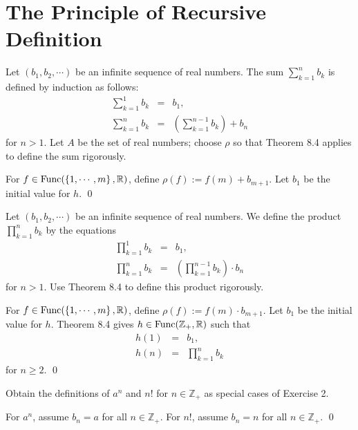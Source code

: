 \documentclass[a4paper,12pt]{article}
\begin{document}
\section{The Principle of Recursive Definition}
\setcounter{exe}{0}
\begin{exe}
	Let \( (b_1,b_2,\cdots) \) be an infinite sequence of real numbers.
	The sum \( \sum_{k=1}^n b_k\) is defined by induction as follows:
	\begin{eqnarray*}
		\sum_{k=1}^1 b_k &=& b_1,\\
		\sum_{k=1}^n b_k &=& \left( \sum_{k=1}^{n-1} b_k \right) + b_n
	\end{eqnarray*}
	for \( n >1 \).
	Let \( A \) be the set of real numbers; choose \( \rho \) so that Theorem 8.4 applies to define the sum rigorously.
\end{exe}
\begin{sol}
	For
	\( f \in \mathrm{Func}(\left\{1, \cdots, m \right\},\mathbb{R}) \),
	define
	\( \rho(f):=f(m) + b_{m+1} \).
	Let \( b_1 \) be the initial value for \( h \).
	\qed\end{sol}

\begin{exe}
	Let \( (b_1,b_2,\cdots) \) be an infinite sequence of real numbers.
	We define the product \( \prod_{k=1}^{n} b_k \) by the equations
	\begin{eqnarray*}
		\prod_{k=1}^1 b_k &=& b_1,\\
		\prod_{k=1}^n b_k &=& \left( \prod_{k=1}^{n-1} b_k \right) \cdot b_n
	\end{eqnarray*}
	for \( n>1 \).
	Use Theorem 8.4 to define this product rigorously.
\end{exe}
\begin{sol}
	For
	\( f \in \mathrm{Func}(\left\{1, \cdots, m \right\},\mathbb{R}) \),
	define
	\( \rho(f):=f(m) \cdot b_{m+1} \).
	Let \( b_1 \) be the initial value for \( h \).
	Theorem 8.4 gives
	\( h\in \mathrm{Func}(\mathbb{Z}_{+},\mathbb{R}) \)
	such that
	\begin{eqnarray*}
		h(1)&=&b_1,\\
		h(n)&=&\prod_{k=1}^n b_k
	\end{eqnarray*}
	for
	\( n \ge 2 \).
	\qed\end{sol}

\begin{exe}
	Obtain the definitions of \( a^n \) and \( n! \) for \( n \in \mathbb{Z}_{+} \)
	as special cases of Exercise 2. 
\end{exe}
\begin{sol}
	For
	\( a^n \),
	assume \( b_n=a \)
	for all
	\( n \in \mathbb{Z}_{+} \).
	For
	\( n! \),
	assume \( b_n=n \)
	for all
	\( n \in \mathbb{Z}_{+} \).
	\qed\end{sol}
\end{document}
